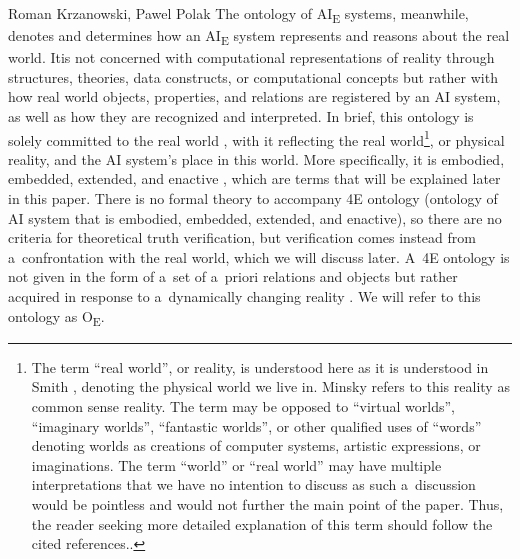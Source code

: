 \begin{artengenv2auth}{Roman Krzanowski, Pawel Polak}
The ontology of AI\textsubscript{E} systems, meanwhile, denotes and determines how an AI\textsubscript{E} system represents and reasons about the real world. Itis not concerned with computational representations of reality through structures, theories, data constructs, or computational concepts but rather with how real world objects, properties, and relations are registered by an AI system, as well as how they are recognized and interpreted. In brief, this ontology is solely committed to the real world
\parencite[in the sense explained by][p.145]{smith_promise_2019}, %
 with it reflecting the real world\footnote{The term ``real world'', or reality, is understood here as it is understood in Smith 
\parencite*[][xiv]{smith_promise_2019}, %
 denoting the physical world we live in. Minsky 
\parencite*[][p.6]{minsky_logical_1991} %
 refers to this reality as common sense reality. The term may be opposed to ``virtual worlds'', ``imaginary worlds'', ``fantastic worlds'', or other qualified uses of ``words'' denoting worlds as creations of computer systems, artistic expressions, or imaginations. The term ``world'' or ``real world'' may have multiple interpretations that we have no intention to discuss as such a~discussion would be pointless and would not further the main point of the paper. Thus, the reader seeking more detailed explanation of this term should follow the cited references..}, or physical reality, and the AI system's place in this world. More specifically, it is embodied, embedded, extended, and enactive 
\parencite[][p.43]{smith_promise_2019}, %
 which are terms that will be explained later in this paper. There is no formal theory to accompany 4E ontology (ontology of AI system that is embodied, embedded, extended, and enactive), so there are no criteria for theoretical truth verification, but verification comes instead from a~confrontation with the real world, which we will discuss later. A~4E ontology is not given in the form of a~set of a~priori relations and objects but rather acquired 
\parencite[][]{smith_promise_2019} %
 in response to a~dynamically changing reality 
\parencites[see][as well as]{minsky_logical_1991}[][]{boltuc_conscious_2020}. %
 We will refer to this ontology as O\textsubscript{E}.


\end{artengenv2auth}
